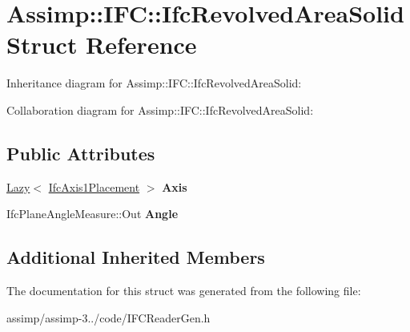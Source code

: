 \hypertarget{struct_assimp_1_1_i_f_c_1_1_ifc_revolved_area_solid}{\section{Assimp\+:\+:I\+F\+C\+:\+:Ifc\+Revolved\+Area\+Solid Struct Reference}
\label{struct_assimp_1_1_i_f_c_1_1_ifc_revolved_area_solid}
}


Inheritance diagram for Assimp\+:\+:I\+F\+C\+:\+:Ifc\+Revolved\+Area\+Solid\+:


Collaboration diagram for Assimp\+:\+:I\+F\+C\+:\+:Ifc\+Revolved\+Area\+Solid\+:
\subsection*{Public Attributes}
\begin{DoxyCompactItemize}
\item 
\hypertarget{struct_assimp_1_1_i_f_c_1_1_ifc_revolved_area_solid_ad3a4afd02f1102b51b97e21695aa518a}{\hyperlink{struct_assimp_1_1_s_t_e_p_1_1_lazy}{Lazy}$<$ \hyperlink{struct_assimp_1_1_i_f_c_1_1_ifc_axis1_placement}{Ifc\+Axis1\+Placement} $>$ {\bfseries Axis}}\label{struct_assimp_1_1_i_f_c_1_1_ifc_revolved_area_solid_ad3a4afd02f1102b51b97e21695aa518a}

\item 
\hypertarget{struct_assimp_1_1_i_f_c_1_1_ifc_revolved_area_solid_a764fbac6fc909c30255cdd41b8afbfe7}{Ifc\+Plane\+Angle\+Measure\+::\+Out {\bfseries Angle}}\label{struct_assimp_1_1_i_f_c_1_1_ifc_revolved_area_solid_a764fbac6fc909c30255cdd41b8afbfe7}

\end{DoxyCompactItemize}
\subsection*{Additional Inherited Members}


The documentation for this struct was generated from the following file\+:\begin{DoxyCompactItemize}
\item 
assimp/assimp-\/3../code/I\+F\+C\+Reader\+Gen.\+h\end{DoxyCompactItemize}
